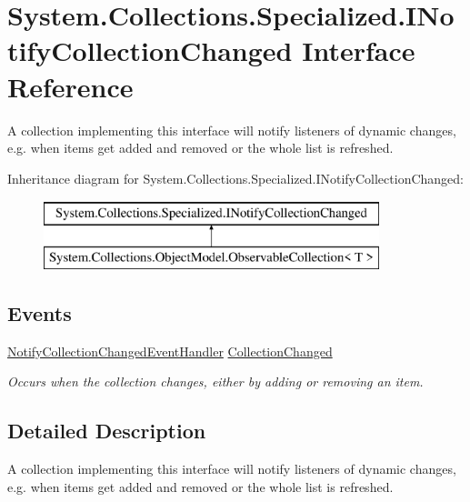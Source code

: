 \hypertarget{interface_system_1_1_collections_1_1_specialized_1_1_i_notify_collection_changed}{}\section{System.\+Collections.\+Specialized.\+I\+Notify\+Collection\+Changed Interface Reference}
\label{interface_system_1_1_collections_1_1_specialized_1_1_i_notify_collection_changed}


A collection implementing this interface will notify listeners of dynamic changes, e.\+g. when items get added and removed or the whole list is refreshed.  


Inheritance diagram for System.\+Collections.\+Specialized.\+I\+Notify\+Collection\+Changed\+:\begin{figure}[H]
\begin{center}
\leavevmode
\includegraphics[height=2.000000cm]{interface_system_1_1_collections_1_1_specialized_1_1_i_notify_collection_changed}
\end{center}
\end{figure}
\subsection*{Events}
\begin{DoxyCompactItemize}
\item 
\hyperlink{namespace_system_1_1_collections_1_1_specialized_af0fd13c7ac27802127a046f55bf0b789}{Notify\+Collection\+Changed\+Event\+Handler} \hyperlink{interface_system_1_1_collections_1_1_specialized_1_1_i_notify_collection_changed_aaabac28f3fd0eb9be7ffbf9ad93ea2bc}{Collection\+Changed}
\begin{DoxyCompactList}\small\item\em Occurs when the collection changes, either by adding or removing an item. \end{DoxyCompactList}\end{DoxyCompactItemize}


\subsection{Detailed Description}
A collection implementing this interface will notify listeners of dynamic changes, e.\+g. when items get added and removed or the whole list is refreshed. 



